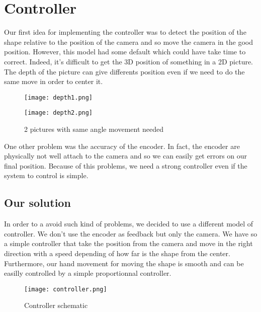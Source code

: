 \section{Controller}
Our first idea for implementing the controller was to detect the position of the shape relative to the position of the camera and so move the camera in the good position. However, this model had some default which could have take time to correct. Indeed, it's  difficult to get the 3D position of something in a 2D picture. The depth of the picture can give differents position even if we need to do the same move in order to center it.

\begin{figure}[!ht]
 \begin{minipage}{0.49\textwidth} %
\begin{center}
 \texttt{[image: depth1.png]}
    \label{titiecrase}
\end{center}
 \end{minipage}
 \begin{minipage}{0.49\textwidth}
 \begin{center}
    \texttt{[image: depth2.png]}
    \label{bochateau}
 \end{center}
 \end{minipage}
\caption{2 pictures with same angle movement needed}
\end{figure}

One other problem was the accuracy of the encoder. In fact, the encoder are physically not well attach to the camera and so we can easily get errors on our final position. Because of this problems, we need a strong controller even if the system to control is simple.

\subsection{Our solution}
In order to a avoid such kind of problems, we decided to use a different model of controller. We don't use the encoder as feedback but only the camera. We have so a simple controller that take the position from the camera and move in the right direction with a speed depending of how far is the shape from the center. Furthermore, our hand movement for moving the shape is smooth and can be easilly controlled by a simple proportionnal controller.

\begin{figure}[!ht]
\centering
 \texttt{[image: controller.png]}
 \caption{Controller schematic}
 \label{contr_sche}
\end{figure}

